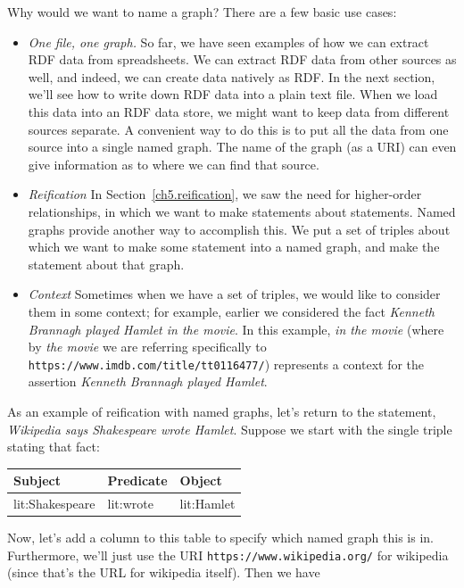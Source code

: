 Why would we want to name a graph?  There are a few basic use cases:

\begin{itemize}
    \item \emph{One file, one graph.} So far, we have seen examples of how we can 
    extract RDF data from spreadsheets.  We can extract RDF data from other sources as well, 
    and indeed, we can create data natively as RDF.  In the next section, we'll see how 
    to write down RDF data into a plain text file.  When we load this data into an RDF data store, we might want to keep data from different sources separate.  A convenient way to do this is to put all the data from one source into a single named graph.  The name of the graph (as a URI) can even give information as to where we can find that source.
    \item \emph{Reification} In Section~\ref{ch5.reification}, we saw the need for higher-order relationships, in which we want to make statements about statements.  Named graphs provide another way to accomplish this.  We put a set of triples about which we want to make some statement into a named graph, and make the statement about that graph.
    \item \emph{Context} Sometimes when we have a set of triples, we would like to consider them in some context; for example, earlier we considered the fact \emph{Kenneth Brannagh played Hamlet in the movie}.  In this example, \emph{in the movie} (where by \emph{the movie} we are referring specifically to \texttt{https://www.imdb.com/title/tt0116477/}) represents a context for the assertion \emph{Kenneth Brannagh played Hamlet}. 
\end{itemize}

As an example of reification with named graphs, let's return to the statement, \emph{Wikipedia says Shakespeare wrote Hamlet}.   Suppose we start with the single triple stating that fact:

\begin{tabular}{|lll|}
\hline
Subject&Predicate&Object\\
\hline
lit:Shakespeare&lit:wrote&lit:Hamlet \\
\hline
\end{tabular}

Now, let's add a column to this table to specify which named graph this is in.  Furthermore, 
we'll just use the URI \texttt{https://www.wikipedia.org/} for wikipedia (since that's the 
URL for wikipedia itself).  Then we have 


